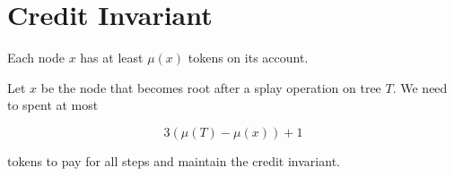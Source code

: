 \section{Credit Invariant}

Each node $x$ has at least $\mu(x)$ tokens on its account.



\begin{mylemma}
Let $x$ be the node that becomes root after a splay operation on tree $T$. We need to spent at most

$$3(\mu(T)-\mu(x)) + 1$$

tokens to pay for all steps and maintain the credit invariant.
\end{mylemma}
